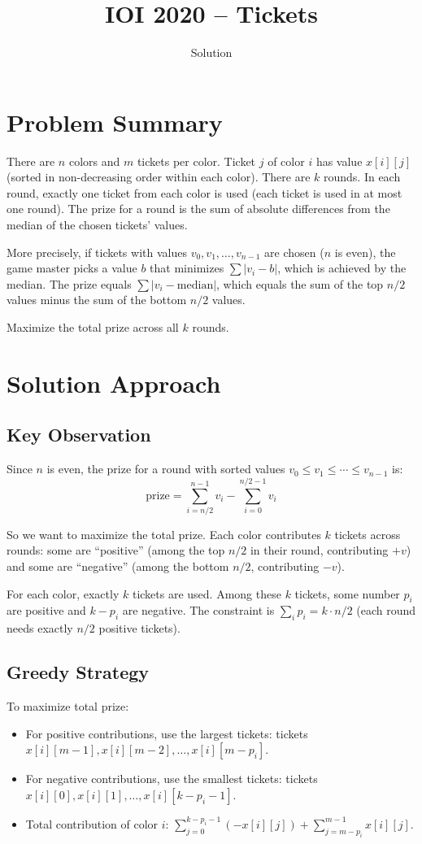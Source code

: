 \documentclass[11pt,a4paper]{article}
\title{IOI 2020 -- Tickets}
\author{Solution}
\date{}
\begin{document}
\maketitle

\section{Problem Summary}
There are $n$ colors and $m$ tickets per color. Ticket $j$ of color $i$ has value $x[i][j]$ (sorted in non-decreasing order within each color). There are $k$ rounds. In each round, exactly one ticket from each color is used (each ticket is used in at most one round). The prize for a round is the sum of absolute differences from the median of the chosen tickets' values.

More precisely, if tickets with values $v_0, v_1, \ldots, v_{n-1}$ are chosen ($n$ is even), the game master picks a value $b$ that minimizes $\sum |v_i - b|$, which is achieved by the median. The prize equals $\sum |v_i - \text{median}|$, which equals the sum of the top $n/2$ values minus the sum of the bottom $n/2$ values.

Maximize the total prize across all $k$ rounds.

\section{Solution Approach}

\subsection{Key Observation}
Since $n$ is even, the prize for a round with sorted values $v_0 \le v_1 \le \cdots \le v_{n-1}$ is:
\[ \text{prize} = \sum_{i=n/2}^{n-1} v_i - \sum_{i=0}^{n/2-1} v_i \]

So we want to maximize the total prize. Each color contributes $k$ tickets across rounds: some are ``positive'' (among the top $n/2$ in their round, contributing $+v$) and some are ``negative'' (among the bottom $n/2$, contributing $-v$).

For each color, exactly $k$ tickets are used. Among these $k$ tickets, some number $p_i$ are positive and $k - p_i$ are negative. The constraint is $\sum_i p_i = k \cdot n/2$ (each round needs exactly $n/2$ positive tickets).

\subsection{Greedy Strategy}
To maximize total prize:
\begin{itemize}
  \item For positive contributions, use the largest tickets: tickets $x[i][m-1], x[i][m-2], \ldots, x[i][m-p_i]$.
  \item For negative contributions, use the smallest tickets: tickets $x[i][0], x[i][1], \ldots, x[i][k-p_i-1]$.
  \item Total contribution of color $i$: $\sum_{j=0}^{k-p_i-1} (-x[i][j]) + \sum_{j=m-p_i}^{m-1} x[i][j]$.
\end{itemize}
\end{document}
